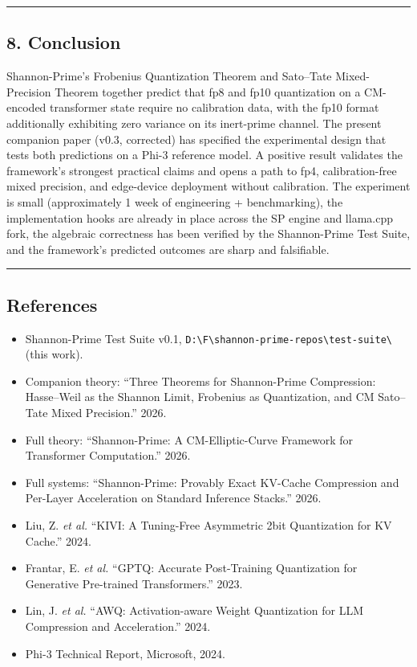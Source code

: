 \documentclass[
  11pt,
]{article}
\providecommand{\tightlist}{%
  \setlength{\itemsep}{0pt}\setlength{\parskip}{0pt}}
\begin{document}
\begin{center}\rule{0.5\linewidth}{0.5pt}\end{center}

\hypertarget{conclusion}{%
\subsection{8. Conclusion}\label{conclusion}}

Shannon-Prime's Frobenius Quantization Theorem and Sato--Tate
Mixed-Precision Theorem together predict that fp8 and fp10 quantization
on a CM-encoded transformer state require no calibration data, with the
fp10 format additionally exhibiting zero variance on its inert-prime
channel. The present companion paper (v0.3, corrected) has specified the
experimental design that tests both predictions on a Phi-3 reference
model. A positive result validates the framework's strongest practical
claims and opens a path to fp4, calibration-free mixed precision, and
edge-device deployment without calibration. The experiment is small
(approximately 1 week of engineering + benchmarking), the implementation
hooks are already in place across the SP engine and llama.cpp fork, the
algebraic correctness has been verified by the Shannon-Prime Test Suite,
and the framework's predicted outcomes are sharp and falsifiable.

\begin{center}\rule{0.5\linewidth}{0.5pt}\end{center}

\hypertarget{references}{%
\subsection{References}\label{references}}

\begin{itemize}
\tightlist
\item
  Shannon-Prime Test Suite v0.1,
  \texttt{D:\textbackslash{}F\textbackslash{}shannon-prime-repos\textbackslash{}test-suite\textbackslash{}}
  (this work).
\item
  Companion theory: ``Three Theorems for Shannon-Prime Compression:
  Hasse--Weil as the Shannon Limit, Frobenius as Quantization, and CM
  Sato--Tate Mixed Precision.'' 2026.
\item
  Full theory: ``Shannon-Prime: A CM-Elliptic-Curve Framework for
  Transformer Computation.'' 2026.
\item
  Full systems: ``Shannon-Prime: Provably Exact KV-Cache Compression and
  Per-Layer Acceleration on Standard Inference Stacks.'' 2026.
\item
  Liu, Z. \emph{et al.} ``KIVI: A Tuning-Free Asymmetric 2bit
  Quantization for KV Cache.'' 2024.
\item
  Frantar, E. \emph{et al.} ``GPTQ: Accurate Post-Training Quantization
  for Generative Pre-trained Transformers.'' 2023.
\item
  Lin, J. \emph{et al.} ``AWQ: Activation-aware Weight Quantization for
  LLM Compression and Acceleration.'' 2024.
\item
  Phi-3 Technical Report, Microsoft, 2024.
\end{itemize}
\end{document}
